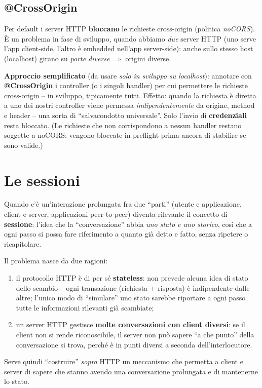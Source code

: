 \subsection{@CrossOrigin}
Per default i server HTTP \textbf{bloccano} le richieste cross-origin (politica
\emph{noCORS}). \`E un problema in fase di sviluppo, quando abbiamo \emph{due} server HTTP
(uno serve l'app client-side, l'altro \`e embedded nell'app server-side): anche sullo stesso
host (localhost) girano su \emph{porte diverse} $\Rightarrow$ origini diverse.

\textbf{Approccio semplificato} (da usare \emph{solo in sviluppo su localhost}): annotare con
\textbf{@CrossOrigin} i controller (o i singoli handler) per cui permettere le richieste
cross-origin -- in sviluppo, tipicamente tutti. Effetto: quando la richiesta \`e diretta a
uno dei nostri controller viene permessa \emph{indipendentemente} da origine, method e
header -- una sorta di ``salvacondotto universale''. Solo l'invio di \textbf{credenziali}
resta bloccato. (Le richieste che non corrispondono a nessun handler restano soggette a
noCORS: vengono bloccate in preflight prima ancora di stabilire se sono valide.)

\section{Le sessioni}

\begin{definizione}[Sessione]
Quando c'\`e un'interazione prolungata fra due ``parti'' (utente e applicazione, client e
server, applicazioni peer-to-peer) diventa rilevante il concetto di \textbf{sessione}:
l'idea che la ``conversazione'' abbia \emph{uno stato e uno storico}, cos\`i che a ogni passo
si possa fare riferimento a quanto gi\`a detto e fatto, senza ripetere o ricapitolare.
\end{definizione}

\begin{importante}
Il problema nasce da due ragioni:
\begin{enumerate}
  \item il protocollo HTTP \`e di per s\'e \textbf{stateless}: non prevede alcuna idea di
        stato dello scambio -- ogni transazione (richiesta + risposta) \`e indipendente
        dalle altre; l'unico modo di ``simulare'' uno stato sarebbe riportare a ogni passo
        tutte le informazioni rilevanti gi\`a scambiate;
  \item un server HTTP gestisce \textbf{molte conversazioni con client diversi}: se il client
        non si rende riconoscibile, il server non pu\`o sapere ``a che punto'' della
        conversazione si trova, perch\'e \`e in punti diversi a seconda dell'interlocutore.
\end{enumerate}
Serve quindi ``costruire'' \emph{sopra} HTTP un meccanismo che permetta a client e server di
sapere che stanno avendo una conversazione prolungata e di mantenerne lo stato.
\end{importante}

